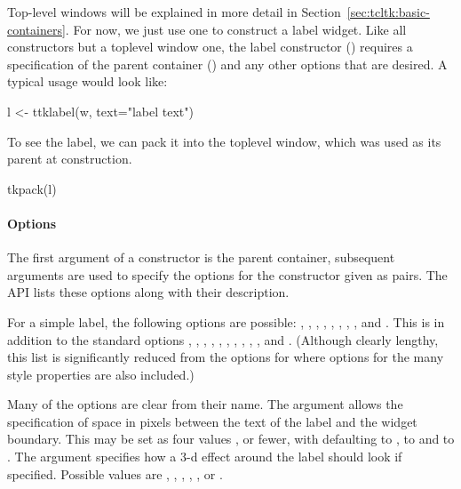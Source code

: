 Top-level windows will be explained in more detail in
Section~\ref{sec:tcltk:basic-containers}. For now, we just use one to
construct a label widget. Like all constructors but a toplevel window
one, the label constructor () requires a
specification of the parent container () and any other options
that are desired. A typical usage would look like:
\begin{Schunk}
\begin{Sinput}
 l <- ttklabel(w, text="label text")
\end{Sinput}
\end{Schunk}

To see the label, we can pack it into the toplevel window, which was
used as its parent at construction.
\begin{Schunk}
\begin{Sinput}
 tkpack(l)
\end{Sinput}
\end{Schunk}

\paragraph{Options}
The first argument of a constructor is the parent container,
subsequent arguments are used to specify the options for the
constructor given as  pairs. The \TK\/ API lists these
options along with their description.

For a simple label, the following options are possible: ,
, , , ,
, , , and .
This is in addition to the standard options ,
, , , ,
, , , ,
, and . (Although clearly lengthy, this
list is significantly reduced from the options for 
where options for the many style properties are also included.)

Many of the options are clear from their name.  The
 argument allows the specification of
space in pixels between the text of the label and the widget
boundary. This may be set as four values , or fewer, with  defaulting to ,
 to  and  to . The
 argument specifies how a 3-d effect around
the label should look if specified. Possible values are ,
, , , , or
.

